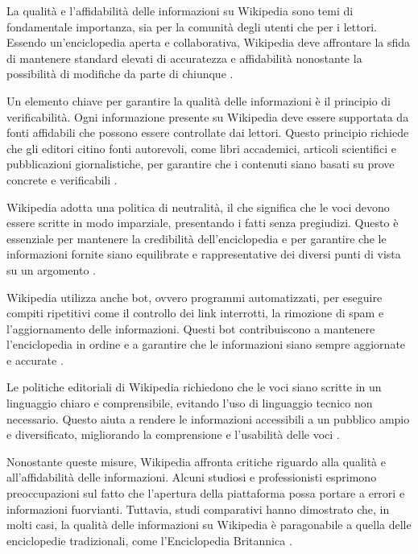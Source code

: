 \documentclass[12pt,a4paper]{report}
\begin{document}
La qualità e l'affidabilità delle informazioni su Wikipedia sono temi di fondamentale importanza, sia per la comunità degli utenti che per i lettori. Essendo un'enciclopedia aperta e collaborativa, Wikipedia deve affrontare la sfida di mantenere standard elevati di accuratezza e affidabilità nonostante la possibilità di modifiche da parte di chiunque \cite{reagle2010good}.

Un elemento chiave per garantire la qualità delle informazioni è il principio di verificabilità. Ogni informazione presente su Wikipedia deve essere supportata da fonti affidabili che possono essere controllate dai lettori. Questo principio richiede che gli editori citino fonti autorevoli, come libri accademici, articoli scientifici e pubblicazioni giornalistiche, per garantire che i contenuti siano basati su prove concrete e verificabili \cite{denning2005wikipedia}.

Wikipedia adotta una politica di neutralità, il che significa che le voci devono essere scritte in modo imparziale, presentando i fatti senza pregiudizi. Questo è essenziale per mantenere la credibilità dell'enciclopedia e per garantire che le informazioni fornite siano equilibrate e rappresentative dei diversi punti di vista su un argomento \cite{reagle2010good}.

Wikipedia utilizza anche bot, ovvero programmi automatizzati, per eseguire compiti ripetitivi come il controllo dei link interrotti, la rimozione di spam e l'aggiornamento delle informazioni. Questi bot contribuiscono a mantenere l'enciclopedia in ordine e a garantire che le informazioni siano sempre aggiornate e accurate \cite{history_of_wikis}.

Le politiche editoriali di Wikipedia richiedono che le voci siano scritte in un linguaggio chiaro e comprensibile, evitando l'uso di linguaggio tecnico non necessario. Questo aiuta a rendere le informazioni accessibili a un pubblico ampio e diversificato, migliorando la comprensione e l'usabilità delle voci \cite{reagle2010good}.

Nonostante queste misure, Wikipedia affronta critiche riguardo alla qualità e all'affidabilità delle informazioni. Alcuni studiosi e professionisti esprimono preoccupazioni sul fatto che l'apertura della piattaforma possa portare a errori e informazioni fuorvianti. Tuttavia, studi comparativi hanno dimostrato che, in molti casi, la qualità delle informazioni su Wikipedia è paragonabile a quella delle enciclopedie tradizionali, come l'Enciclopedia Britannica \cite{giles2005nature}.
\end{document}
